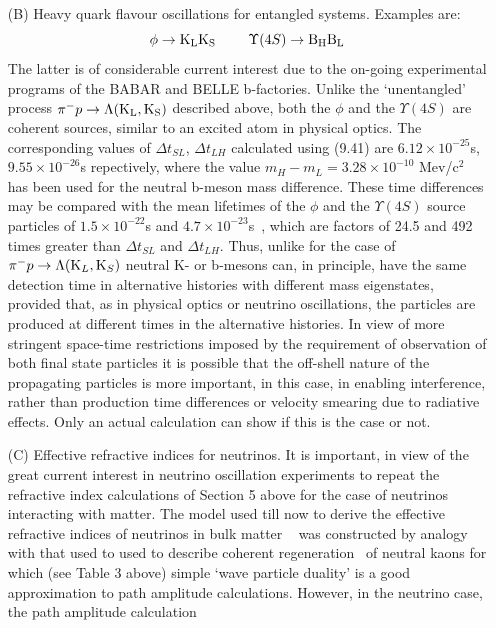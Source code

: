 \documentclass [12pt]{article}
\begin{document}
{\begin{itemize}
    \item[(B)] Heavy quark flavour oscillations for entangled systems. Examples are:
   \[ \phi \rightarrow {\rm K_L} {\rm K_S}~~~~~~~\Upsilon(4S) \rightarrow {\rm B_H} {\rm B_L}  \]
      The latter is of considerable current interest due to the on-going 
    experimental programs of the BABAR and BELLE b-factories. Unlike the `unentangled' process
     $\pi^- p \rightarrow \Lambda ({\rm K_L}, {\rm K_S})$ described above, both the $\phi$
   and the $\Upsilon(4S)$ are coherent sources, similar to an excited atom in physical optics.
    The corresponding values of $\Delta t_{SL}$, $\Delta t_{LH}$ calculated using (9.41) 
    are $6.12 \times 10^{-25}$s, $9.55 \times 10^{-26}$s  repectively, where the value
    $m_H-m_L = 3.28 \times 10^{-10}$ Mev/c$^2$~\cite{PDG04} has been used for the neutral
   b-meson mass difference. These time differences may be compared with the mean lifetimes 
   of the $\phi$ and the $\Upsilon(4S)$ source particles of
      $1.5 \times 10^{-22}$s and $4.7 \times 10^{-23}$s~\cite{PDG04}, which are factors 
    of 24.5 and 492 times greater than  $\Delta t_{SL}$ and  $\Delta t_{LH}$. Thus, unlike for the 
    case of  $\pi^- p \rightarrow \Lambda ({\rm K}_L, {\rm K}_S)$ neutral K- or b-mesons
    can, in principle, have the same detection time in alternative histories with different
    mass eigenstates, provided that, as in physical optics or neutrino oscillations, the particles
    are produced at different times in the alternative histories. In view of more stringent
   space-time restrictions imposed by the requirement of observation of both final state particles
   it is possible that the off-shell nature of the propagating particles is more important, in this case, in
   enabling interference, rather than production time differences or velocity smearing due to 
   radiative effects. Only an actual calculation can show if this is the case or not.
  \item[(C)] Effective refractive indices for neutrinos. 
  It is important, in view of the great current interest in neutrino oscillation 
    experiments to repeat the refractive index calculations of Section 5 above for the case of
  neutrinos interacting with matter. The model used till now to derive the effective
   refractive indices of neutrinos in bulk matter ~\cite{Wolfenstein,MS} was constructed
  by analogy with that used to used to describe coherent regeneration~\cite{PP} of neutral kaons
   for which (see Table 3 above) simple `wave particle duality' is a good approximation
   to path amplitude calculations. However, in the neutrino case, the path amplitude calculation

\end{itemize}}
\end{document}
